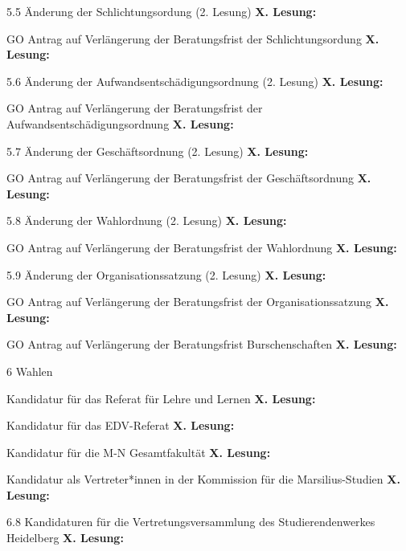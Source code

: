 5.5 Änderung der Schlichtungsordung (2. Lesung)
\textbf{X. Lesung:}
\ul{
}

GO Antrag auf Verlängerung der Beratungsfrist der Schlichtungsordung
\textbf{X. Lesung:}
\ul{
}

5.6 Änderung der Aufwandsentschädigungsordnung (2. Lesung)
\textbf{X. Lesung:}
\ul{
}

GO Antrag auf Verlängerung der Beratungsfrist der Aufwandsentschädigungsordnung
\textbf{X. Lesung:}
\ul{
}

5.7 Änderung der Geschäftsordnung (2. Lesung)
\textbf{X. Lesung:}
\ul{
}

GO Antrag auf Verlängerung der Beratungsfrist der Geschäftsordnung
\textbf{X. Lesung:}
\ul{
}

5.8 Änderung der Wahlordnung (2. Lesung)
\textbf{X. Lesung:}
\ul{
}

GO Antrag auf Verlängerung der Beratungsfrist der Wahlordnung
\textbf{X. Lesung:}
\ul{
}

5.9 Änderung der Organisationssatzung (2. Lesung)
\textbf{X. Lesung:}
\ul{
}

GO Antrag auf Verlängerung der Beratungsfrist der Organisationssatzung
\textbf{X. Lesung:}
\ul{
}

GO Antrag auf Verlängerung der Beratungsfrist Burschenschaften
\textbf{X. Lesung:}
\ul{
}

6 Wahlen

Kandidatur für das Referat für Lehre und Lernen
\textbf{X. Lesung:}
\ul{
}

Kandidatur für das EDV-Referat
\textbf{X. Lesung:}
\ul{
}

Kandidatur für die M-N Gesamtfakultät
\textbf{X. Lesung:}
\ul{
}

Kandidatur als Vertreter*innen in der Kommission für die Marsilius-Studien
\textbf{X. Lesung:}
\ul{
}

6.8 Kandidaturen für die Vertretungsversammlung des Studierendenwerkes Heidelberg
\textbf{X. Lesung:}
\ul{
}

